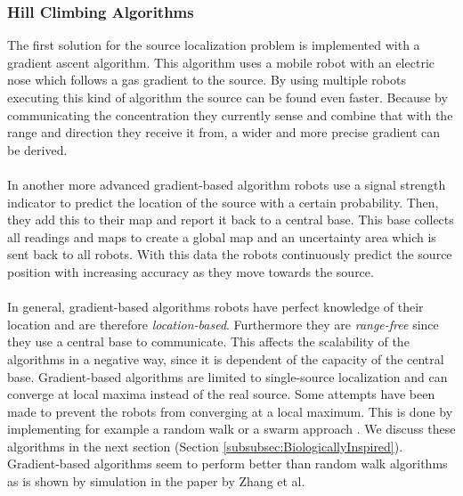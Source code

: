 	\subsubsection{Hill Climbing Algorithms}
		The first solution for the source localization problem is implemented with a gradient ascent algorithm.
		This algorithm uses a mobile robot with an electric nose which follows a gas gradient to the source. \cite{rozas1991artificial}
		By using multiple robots executing this kind of algorithm the source can be found even faster.
		Because by communicating the concentration they currently sense and combine that with the range and direction they receive it from, a wider and more precise gradient can be derived. \cite{sandini1993gradient}\\
		\\
		In another more advanced gradient-based algorithm robots use a signal strength indicator to predict the location of the source with a certain probability.
		Then, they add this to their map and report it back to a central base.
		This base collects all readings and maps to create a global map and an uncertainty area which is sent back to all robots.
		With this data the robots continuously predict the source position with increasing accuracy as they move towards the source. \cite{zhang2009gradient}\\
		\\
		In general, gradient-based algorithms robots have perfect knowledge of their location and are therefore \emph{location-based}.
		Furthermore they are \emph{range-free} since they use a central base to communicate.
		This affects the scalability of the algorithms in a negative way, since it is dependent of the capacity of the central base.
		Gradient-based algorithms are limited to single-source localization and can converge at local maxima instead of the real source.
		Some attempts have been made to prevent the robots from converging at a local maximum.
		This is done by implementing for example a random walk \cite{dhariwal2004bacterium} or a swarm approach \cite{cui2004swarm}. 
		We discuss these algorithms in the next section (Section \ref{subsubsec:BiologicallyInspired}).
		Gradient-based algorithms seem to perform better than random walk algorithms as is shown by simulation in the paper by Zhang et al. \cite{zhang2009gradient}

